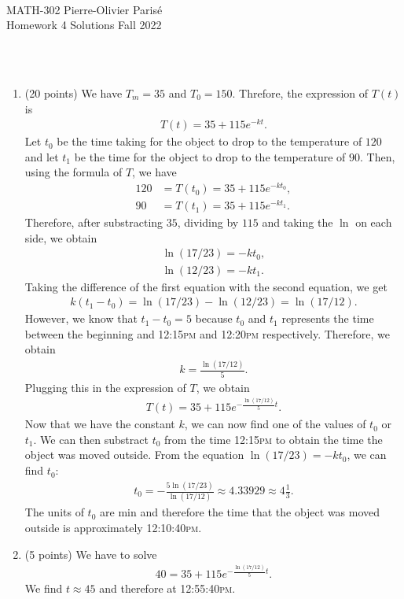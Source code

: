 \documentclass[12pt]{article}
\newcommand{\spc}{\vspace*{0.5cm}}
\newcommand{\exo}[3]{\noindent\textcolor{red}{\fbox{\textbf{Section {#1} | Problem {#2} | {#3} points}}}\\}
\begin{document}
	\noindent \hrulefill \\
	MATH-302 \hfill Pierre-Olivier Paris{\'e}\\
	Homework 4 Solutions \hfill Fall 2022\\\vspace*{-1cm}
	
	\noindent\hrulefill
	
	\spc
	
	\exo{4.2}{5}{25}
	\\
	\begin{enumerate}[label=(\alph*)]
	\item (20 points) We have $T_m = 35$ and $T_0 = 150$. Threfore, the expression of $T(t)$ is
		\begin{align*}
		T(t) = 35 + 115 e^{-k t} .
		\end{align*}
	Let $t_0$ be the time taking for the object to drop to the temperature of $120$ and let $t_1$ be the time for the object to drop to the temperature of $90$. Then, using the formula of $T$, we have
		\begin{align*}
		120 &= T(t_0) = 35 + 115 e^{-k t_0} , \\
		90 &= T(t_1) = 35 + 115 e^{-k t_1} .
		\end{align*}
	Therefore, after substracting $35$, dividing by $115$ and taking the $\ln$ on each side, we obtain
		\begin{align*}
		\ln (17 / 23) = -k t_0 , \\
		\ln (12/23) = -k t_1 .
		\end{align*}
	Taking the difference of the first equation with the second equation, we get
		\begin{align*}
		k(t_1 - t_0) = \ln (17/23) - \ln (12/23) = \ln (17/12) .
		\end{align*}
	However, we know that $t_1 - t_0 = 5$ because $t_0$ and $t_1$ represents the time between the beginning and 12:15\textsc{pm} and 12:20\textsc{pm} respectively. Therefore, we obtain
		\begin{align*}
		k = \frac{\ln (17 / 12)}{5} .
		\end{align*}
	Plugging this in the expression of $T$, we obtain
		\begin{align*}
		T(t) = 35 + 115 e^{-\frac{\ln(17/12)}{5} t} .
		\end{align*}
	Now that we have the constant $k$, we can now find one of the values of $t_0$ or $t_1$. We can then substract $t_0$ from the time 12:15\textsc{pm} to obtain the time the object was moved outside. From the equation $\ln (17/23) = -k t_0$, we can find $t_0$:
		\begin{align*}
		t_0 = - \frac{5\ln (17/23)}{\ln (17/12)} \approx 4.33929 \approx 4 \tfrac{1}{3} .
		\end{align*}
	The units of $t_0$ are $\mathrm{min}$ and therefore the time that the object was moved outside is approximately 12:10:40\textsc{pm}.
	\item (5 points) We have to solve
		\begin{align*}
		40 = 35 + 115 e^{- \frac{\ln (17/12)}{5} t} .
		\end{align*}
	We find $t \approx 45$ and therefore at 12:55:40\textsc{pm}.
	\end{enumerate}
	
\end{document}
